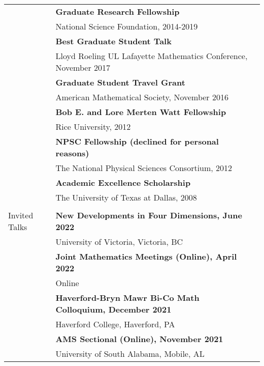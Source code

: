 \documentclass[letterpaper,11pt,oneside]{article}
\begin{document}
          \noindent \begin{tabular}{@{} l l l} 
     & \textbf{Graduate Research Fellowship} \\
     & National Science Foundation, 2014-2019 \\
         
     & \textbf{Best Graduate Student Talk} \\
     & Lloyd Roeling UL Lafayette Mathematics Conference, November 2017 \\
  
      & \textbf{Graduate Student Travel Grant} \\
     & American Mathematical Society, November 2016 \\
     
        & \textbf{Bob E. and Lore Merten Watt Fellowship } \\
     & Rice University, 2012 \\
     
  
     
          & \textbf{NPSC Fellowship (declined for personal reasons)} \\
     & The National Physical Sciences Consortium, 2012 \\
   & \textbf{Academic Excellence Scholarship} \\
    & The University of Texas at Dallas, 2008 \\
     & \\
     
 
   
   
       \Large{Invited Talks} 
       
          &   \textbf{New Developments in Four Dimensions,  June 2022} \\
   & University of Victoria, Victoria, BC \\
   &   \textbf{Joint Mathematics Meetings (Online),  April 2022} \\
   & Online \\
          &   \textbf{Haverford-Bryn Mawr Bi-Co Math Colloquium,  December 2021} \\
   & Haverford College, Haverford, PA \\
   &   \textbf{AMS Sectional (Online),  November 2021} \\
   & University of South Alabama, Mobile, AL\\


\end{tabular}
\end{document}
